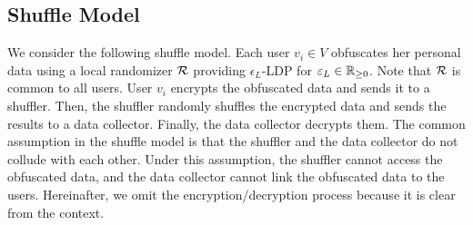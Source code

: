 \subsection{Shuffle Model}
\label{chap3-sub:shuffle}
We consider the following shuffle model. 
Each user $v_i \in V$ obfuscates her personal data 
using a local randomizer $\mathcal{R}$ providing $\epsilon_L$-LDP for $\varepsilon_L \in \mathbb{R}_{\ge0}$. 
Note that $\mathcal{R}$ is common to all users. 
User $v_i$ encrypts the obfuscated data and sends it to a shuffler. 
Then, the shuffler randomly shuffles the encrypted data and sends the results to a data collector. 
Finally, the data collector decrypts them. 
The common assumption in the shuffle model is that the shuffler and the data collector do not collude with each other. 
Under this assumption, the shuffler cannot access the obfuscated data, and the data collector cannot link the obfuscated data to the users. 
Hereinafter, we omit the encryption/decryption process because it is clear from the context. 

